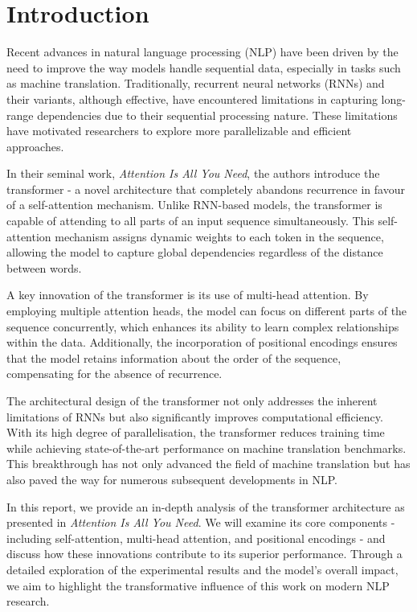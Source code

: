 \section{Introduction}

Recent advances in natural language processing (NLP) have been driven by the need to improve the way models handle sequential data, especially in tasks such as machine translation. Traditionally, recurrent neural networks (RNNs) and their variants, although effective, have encountered limitations in capturing long-range dependencies due to their sequential processing nature. These limitations have motivated researchers to explore more parallelizable and efficient approaches.

In their seminal work, \textit{Attention Is All You Need}, the authors introduce the transformer - a novel architecture that completely abandons recurrence in favour of a self-attention mechanism. Unlike RNN-based models, the transformer is capable of attending to all parts of an input sequence simultaneously. This self-attention mechanism assigns dynamic weights to each token in the sequence, allowing the model to capture global dependencies regardless of the distance between words.

A key innovation of the transformer is its use of multi-head attention. By employing multiple attention heads, the model can focus on different parts of the sequence concurrently, which enhances its ability to learn complex relationships within the data. Additionally, the incorporation of positional encodings ensures that the model retains information about the order of the sequence, compensating for the absence of recurrence.

The architectural design of the transformer not only addresses the inherent limitations of RNNs but also significantly improves computational efficiency. With its high degree of parallelisation, the transformer reduces training time while achieving state-of-the-art performance on machine translation benchmarks. This breakthrough has not only advanced the field of machine translation but has also paved the way for numerous subsequent developments in NLP.

In this report, we provide an in-depth analysis of the transformer architecture as presented in \textit{Attention Is All You Need}. We will examine its core components - including self-attention, multi-head attention, and positional encodings - and discuss how these innovations contribute to its superior performance. Through a detailed exploration of the experimental results and the model's overall impact, we aim to highlight the transformative influence of this work on modern NLP research.
